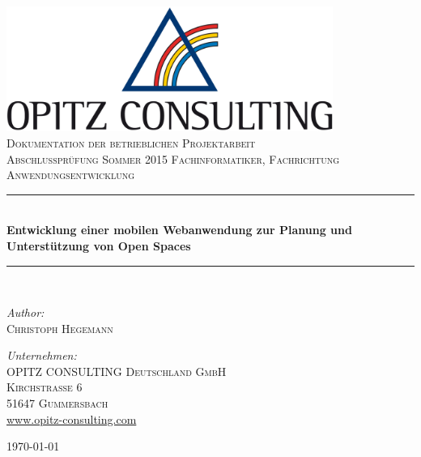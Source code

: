 \begin{titlepage}
\begin{center}

\includegraphics[width=0.80\textwidth]{img/oc-logo.jpg}\\[1cm]

\textsc{\LARGE Dokumentation der betrieblichen Projektarbeit}\\[1.5cm]

\textsc{\Large Abschlussprüfung Sommer 2015 Fachinformatiker, Fachrichtung Anwendungsentwicklung}\\[0.5cm]

\newcommand{\HRule}{\rule{\linewidth}{0.5mm}}
\HRule\\[0.4cm]
{ \huge \bfseries Entwicklung einer mobilen Webanwendung zur Planung und Unterstützung von Open Spaces}\\[0.4cm]
\HRule\\[1.5cm]

\begin{minipage}{0.3\textwidth}
\begin{flushleft} \large
\emph{Author:}\\
\textsc{Christoph Hegemann}
\end{flushleft}
\end{minipage}
\hfill
\begin{minipage}{0.5\textwidth}
\begin{flushright} \large
\emph{Unternehmen:} \\
\textsc{OPITZ CONSULTING Deutschland GmbH}\\
\textsc{Kirchstraße 6}\\
\textsc{51647 Gummersbach}\\
\url{www.opitz-consulting.com}
\end{flushright}
\end{minipage}

\vfill
{\large \today}
\end{center}
\end{titlepage}

